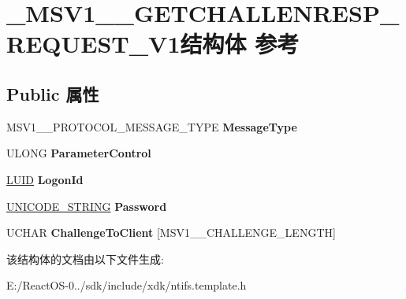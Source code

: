 \hypertarget{struct___m_s_v1__0___g_e_t_c_h_a_l_l_e_n_r_e_s_p___r_e_q_u_e_s_t___v1}{}\section{\+\_\+\+M\+S\+V1\+\_\+\_\+\+G\+E\+T\+C\+H\+A\+L\+L\+E\+N\+R\+E\+S\+P\+\_\+\+R\+E\+Q\+U\+E\+S\+T\+\_\+\+V1结构体 参考}
\label{struct___m_s_v1__0___g_e_t_c_h_a_l_l_e_n_r_e_s_p___r_e_q_u_e_s_t___v1}
\subsection*{Public 属性}
\begin{DoxyCompactItemize}
\item 
\mbox{\label{struct___m_s_v1__0___g_e_t_c_h_a_l_l_e_n_r_e_s_p___r_e_q_u_e_s_t___v1_ab24bfa328da67625aa47a8f7a5734b10}} 
M\+S\+V1\+\_\+\_\+\+P\+R\+O\+T\+O\+C\+O\+L\+\_\+\+M\+E\+S\+S\+A\+G\+E\+\_\+\+T\+Y\+PE {\bfseries Message\+Type}
\item 
\mbox{\label{struct___m_s_v1__0___g_e_t_c_h_a_l_l_e_n_r_e_s_p___r_e_q_u_e_s_t___v1_a2da48a396e84de745c00dff74ae86f64}} 
U\+L\+O\+NG {\bfseries Parameter\+Control}
\item 
\mbox{\label{struct___m_s_v1__0___g_e_t_c_h_a_l_l_e_n_r_e_s_p___r_e_q_u_e_s_t___v1_ab162fae11cb42cd5021220a057795026}} 
\hyperlink{struct___l_u_i_d}{L\+U\+ID} {\bfseries Logon\+Id}
\item 
\mbox{\label{struct___m_s_v1__0___g_e_t_c_h_a_l_l_e_n_r_e_s_p___r_e_q_u_e_s_t___v1_ac87dca921c62ff16de0208e5edf601c4}} 
\hyperlink{struct___u_n_i_c_o_d_e___s_t_r_i_n_g}{U\+N\+I\+C\+O\+D\+E\+\_\+\+S\+T\+R\+I\+NG} {\bfseries Password}
\item 
\mbox{\label{struct___m_s_v1__0___g_e_t_c_h_a_l_l_e_n_r_e_s_p___r_e_q_u_e_s_t___v1_a1cdd26d5c632335a5a08d81b510979cb}} 
U\+C\+H\+AR {\bfseries Challenge\+To\+Client} \mbox{[}M\+S\+V1\+\_\+\_\+\+C\+H\+A\+L\+L\+E\+N\+G\+E\+\_\+\+L\+E\+N\+G\+TH\mbox{]}
\end{DoxyCompactItemize}


该结构体的文档由以下文件生成\+:\begin{DoxyCompactItemize}
\item 
E\+:/\+React\+O\+S-\/0../sdk/include/xdk/ntifs.\+template.\+h\end{DoxyCompactItemize}
